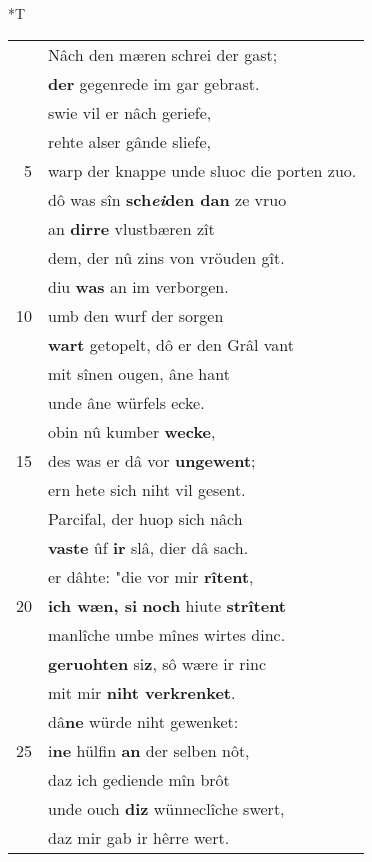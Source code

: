\documentclass[8pt,a4paper,notitlepage]{article}
\begin{document}
\begin{table}[ht]
\begin{minipage}[t]{0.5\linewidth}
\end{minipage}
\hspace{0.5cm}
\begin{minipage}[t]{0.5\linewidth}
\small
\begin{center}*T
\end{center}
\begin{tabular}{rl}
 & Nâch den mæren schrei der gast;\\ 
 & \textbf{der} gegenrede im gar gebrast.\\ 
 & swie vil er nâch geriefe,\\ 
 & rehte alser gânde sliefe,\\ 
5 & warp der knappe unde sluoc die porten zuo.\\ 
 & dô was sîn \textbf{sch\textit{ei}den dan} ze vruo\\ 
 & an \textbf{dirre} vlustbæren zît\\ 
 & dem, der nû zins von vröuden gît.\\ 
 & diu \textbf{was} an im verborgen.\\ 
10 & umb den wurf der sorgen\\ 
 & \textbf{wart} getopelt, dô er den Grâl vant\\ 
 & mit sînen ougen, âne hant\\ 
 & unde âne würfels ecke.\\ 
 & obin nû kumber \textbf{wecke},\\ 
15 & des was er dâ vor \textbf{ungewent};\\ 
 & ern hete sich niht vil gesent.\\ 
 & Parcifal, der huop sich nâch\\ 
 & \textbf{vaste} ûf \textbf{ir} slâ, dier dâ sach.\\ 
 & er dâhte: "die vor mir \textbf{rîtent},\\ 
20 & \textbf{ich wæn, si} \textbf{noch} hiute \textbf{strîtent}\\ 
 & manlîche umbe mînes wirtes dinc.\\ 
 & \textbf{geruohten} si\textbf{z}, sô wære ir rinc\\ 
 & mit mir \textbf{niht verkrenket}.\\ 
 & dâ\textbf{ne} würde niht gewenket:\\ 
25 & i\textbf{ne} hülfin \textbf{an} der selben nôt,\\ 
 & daz ich gediende mîn brôt\\ 
 & unde ouch \textbf{diz} wünneclîche swert,\\ 
 & daz mir gab ir hêrre wert.\\ 

\end{tabular}
\end{minipage}
\end{table}
\end{document}
